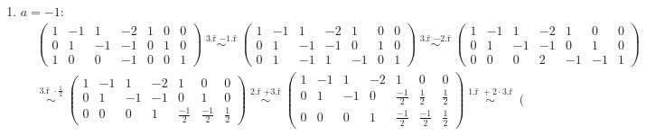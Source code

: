 \documentclass[12pt]{article}
\begin{document}
\begin{enumerate}
\begin{enumerate}
\begin{enumerate}
            \item $a=-1$:
              \begin{align*}
                &\left(\begin{array}{cccc|ccc}
                  1 & -1 & 1 & -2 & 1 & 0 & 0 \\
                  0 & 1 & -1 & -1 & 0 & 1 & 0 \\
                  1 & 0 & 0 & -1 & 0 & 0 & 1
                \end{array}\right)
                \overset{\text{3.ř } -\text{1.ř}}{\;\sim\;}
                \left(\begin{array}{cccc|ccc}
                  1 & -1 & 1 & -2 & 1 & 0 & 0 \\
                  0 & 1 & -1 & -1 & 0 & 1 & 0 \\
                  0 & 1 & -1 & 1 & -1 & 0 & 1
                \end{array}\right)
                \overset{\text{3.ř } -\text{2.ř}}{\;\sim\;}
                \left(\begin{array}{cccc|ccc}
                  1 & -1 & 1 & -2 & 1 & 0 & 0 \\
                  0 & 1 & -1 & -1 & 0 & 1 & 0 \\
                  0 & 0 & 0 & 2 & -1 & -1 & 1
                \end{array}\right)
              \\
                &\overset{\text{3.ř } \cdot\frac{1}{2}}{\;\sim\;}
                \left(\begin{array}{cccc|ccc}
                  1 & -1 & 1 & -2 & 1 & 0 & 0 \\
                  0 & 1 & -1 & -1 & 0 & 1 & 0 \\
                  0 & 0 & 0 & 1 & \frac{-1}{2} & \frac{-1}{2} & \frac{1}{2}
                \end{array}\right)
                \overset{\text{2.ř } +\text{3.ř}}{\;\sim\;}
                \left(\begin{array}{cccc|ccc}
                  1 & -1 & 1 & -2 & 1 & 0 & 0 \\
                  0 & 1 & -1 & 0 & \frac{-1}{2} & \frac{1}{2} & \frac{1}{2} \\
                  0 & 0 & 0 & 1 & \frac{-1}{2} & \frac{-1}{2} & \frac{1}{2}
                \end{array}\right)
                \overset{\text{1.ř } +2\cdot\text{3.ř}}{\;\sim\;}
                \left(\begin{array}{cccc|ccc}

\end{array}
\end{align*}
\end{enumerate}
\end{enumerate}
\end{enumerate}
\end{document}
